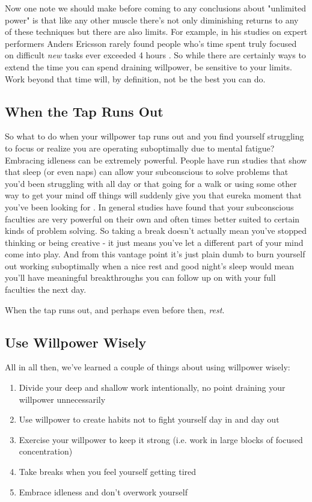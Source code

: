 \documentclass[11pt,a5paper]{book}
\begin{document}
Now one note we should make before coming to any conclusions about "unlimited power" is that like any other muscle there's not only diminishing returns to any of these techniques but there are also limits. For example, in his studies on expert performers Anders Ericsson rarely found people who's time spent truly focused on difficult \textit{new} tasks ever exceeded 4 hours \cite{newport}. So while there are certainly ways to extend the time you can spend draining willpower, be sensitive to your limits. Work beyond that time will, by definition, not be the best you can do.

\subsection{When the Tap Runs Out}
So what to do when your willpower tap runs out and you find yourself struggling to focus or realize you are operating suboptimally due to mental fatigue? Embracing idleness can be extremely powerful. People have run studies that show that sleep (or even naps) can allow your subconscious to solve problems that you'd been struggling with all day \cite{kaufman} or that going for a walk or using some other way to get your mind off things will suddenly give you that eureka moment that you've been looking for \cite{newport}. In general studies have found that your subconscious faculties are very powerful on their own and often times better suited to certain kinds of problem solving. So taking a break doesn't actually mean you've stopped thinking or being creative - it just means you've let a different part of your mind come into play. And from this vantage point it's just plain dumb to burn yourself out working suboptimally when a nice rest and good night's sleep would mean you'll have meaningful breakthroughs you can follow up on with your full faculties the next day.
\newline

When the tap runs out, and perhaps even before then, \textit{rest}.

\subsection{Use Willpower Wisely}
All in all then, we've learned a couple of things about using willpower wisely:
\begin{enumerate}
\item Divide your deep and shallow work intentionally, no point draining your willpower unnecessarily
\item Use willpower to create habits not to fight yourself day in and day out
\item Exercise your willpower to keep it strong (i.e. work in large blocks of focused concentration)
\item Take breaks when you feel yourself getting tired 
\item Embrace idleness and don't overwork yourself
\end{enumerate}
\end{document}
